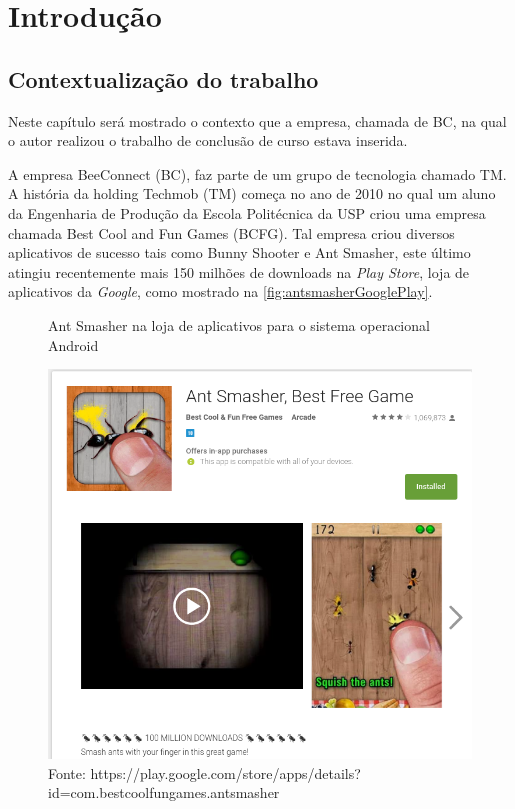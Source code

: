 \chapter[Introdução]{Introdução}
\label{chap:introducao}
\section{Contextualização do trabalho}
\label{cha:contexto}

Neste capítulo será mostrado o contexto que a empresa, chamada de BC, na qual o autor realizou o trabalho de conclusão de curso estava inserida.

A empresa BeeConnect (BC), faz parte de um grupo de tecnologia chamado TM. A história da holding Techmob (TM) começa no ano de 2010 no qual um aluno da Engenharia de Produção da Escola Politécnica da USP criou uma empresa chamada Best Cool and Fun Games (BCFG). Tal empresa criou diversos aplicativos de sucesso tais como Bunny Shooter e Ant Smasher, este último atingiu recentemente mais 150 milhões de downloads na \textit{Play Store}, loja de aplicativos da \textit{Google}, como mostrado na \autoref{fig:antsmasherGooglePlay}. 

\begin{figure}[H]
\caption{Ant Smasher na loja de aplicativos para o sistema operacional Android}
\centerline{\includegraphics[scale=0.5]{img/antsmasherGooglePlay}}
\label{fig:antsmasherGooglePlay}
\caption* {Fonte: https://play.google.com/store/apps/details?id=com.bestcoolfungames.antsmasher}
\end{figure}

